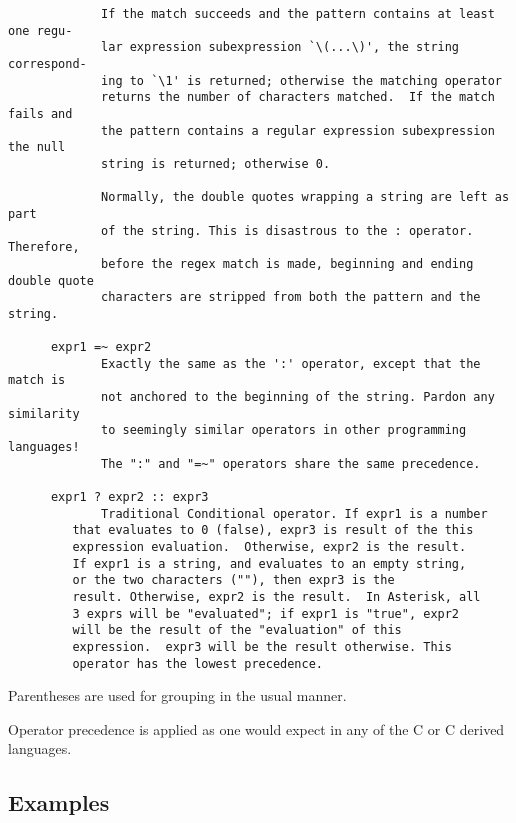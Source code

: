 \begin{verbatim}
             If the match succeeds and the pattern contains at least one regu-
             lar expression subexpression `\(...\)', the string correspond-
             ing to `\1' is returned; otherwise the matching operator
             returns the number of characters matched.  If the match fails and
             the pattern contains a regular expression subexpression the null
             string is returned; otherwise 0.

             Normally, the double quotes wrapping a string are left as part
             of the string. This is disastrous to the : operator. Therefore,
             before the regex match is made, beginning and ending double quote
             characters are stripped from both the pattern and the string.

      expr1 =~ expr2
             Exactly the same as the ':' operator, except that the match is
             not anchored to the beginning of the string. Pardon any similarity
             to seemingly similar operators in other programming languages!
             The ":" and "=~" operators share the same precedence.

      expr1 ? expr2 :: expr3
             Traditional Conditional operator. If expr1 is a number
	     that evaluates to 0 (false), expr3 is result of the this
	     expression evaluation.  Otherwise, expr2 is the result.
	     If expr1 is a string, and evaluates to an empty string,
	     or the two characters (""), then expr3 is the
	     result. Otherwise, expr2 is the result.  In Asterisk, all
	     3 exprs will be "evaluated"; if expr1 is "true", expr2
	     will be the result of the "evaluation" of this
	     expression.  expr3 will be the result otherwise. This
	     operator has the lowest precedence.
\end{verbatim}

Parentheses are used for grouping in the usual manner.

Operator precedence is applied as one would expect in any of the C
or C derived languages.

\subsection{Examples}

